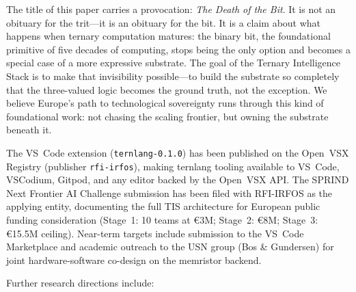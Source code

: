 \documentclass[11pt,a4paper]{article}
\begin{document}
The title of this paper carries a provocation: \textit{The Death of the Bit}.
It is not an obituary for the trit---it is an obituary for the bit.
It is a claim about what happens when ternary computation matures: the binary bit,
the foundational primitive of five decades of computing, stops being the only
option and becomes a special case of a more expressive substrate. The goal of the Ternary Intelligence Stack
is to make that invisibility possible---to build the substrate so completely
that the three-valued logic becomes the ground truth, not the exception.
We believe Europe's path to technological sovereignty runs through this kind
of foundational work: not chasing the scaling frontier, but owning the substrate
beneath it.

The VS~Code extension (\texttt{ternlang-0.1.0}) has been published on the
Open~VSX Registry (publisher \texttt{rfi-irfos}), making ternlang tooling
available to VS~Code, VSCodium, Gitpod, and any editor backed by the Open~VSX
API. The SPRIND Next Frontier AI Challenge submission has been filed with RFI-IRFOS
as the applying entity, documenting the full TIS architecture for European public
funding consideration (Stage~1: 10 teams at €3M; Stage~2: €8M; Stage~3: €15.5M ceiling).
Near-term targets include submission to the VS~Code Marketplace and academic
outreach to the USN group (Bos \& Gundersen) for joint hardware-software
co-design on the memristor backend.

Further research directions include:
\end{document}
